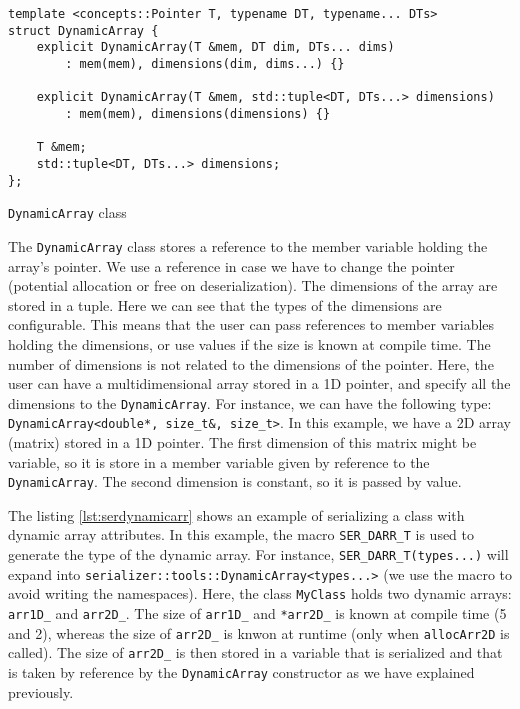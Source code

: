 \begin{listing}[ht!]
\begin{verbatim}
template <concepts::Pointer T, typename DT, typename... DTs>
struct DynamicArray {
    explicit DynamicArray(T &mem, DT dim, DTs... dims)
        : mem(mem), dimensions(dim, dims...) {}

    explicit DynamicArray(T &mem, std::tuple<DT, DTs...> dimensions)
        : mem(mem), dimensions(dimensions) {}

    T &mem;
    std::tuple<DT, DTs...> dimensions;
};
\end{verbatim}
\caption{\texttt{DynamicArray} class}
\label{lst:dynamicarray}
\end{listing}

The \texttt{DynamicArray} class stores a reference to the member variable
holding the array's pointer. We use a reference in case we have to change the
pointer (potential allocation or free on deserialization). The dimensions of the
array are stored in a tuple. Here we can see that the types of the dimensions
are configurable. This means that the user can pass references to member
variables holding the dimensions, or use values if the size is known at compile
time. The number of dimensions is not related to the dimensions of the pointer.
Here, the user can have a multidimensional array stored in a 1D pointer, and
specify all the dimensions to the \texttt{DynamicArray}. For instance, we can
have the following type: \texttt{DynamicArray<double*, size\_t\&, size\_t>}. In
this example, we have a 2D array (matrix) stored in a 1D pointer. The first
dimension of this matrix might be variable, so it is store in a member variable
given by reference to the \texttt{DynamicArray}. The second dimension is
constant, so it is passed by value.

The listing \ref{lst:serdynamicarr} shows an example of serializing a class with
dynamic array attributes. In this example, the macro \texttt{SER\_DARR\_T} is
used to generate the type of the dynamic array. For instance,
\texttt{SER\_DARR\_T(types...)} will expand into
\texttt{serializer::tools::DynamicArray<types...>} (we use the macro to avoid
writing the namespaces). Here, the class \texttt{MyClass} holds two dynamic
arrays: \texttt{arr1D\_} and \texttt{arr2D\_}. The size of \texttt{arr1D\_} and
\texttt{*arr2D\_} is known at compile time (5 and 2), whereas the size of
\texttt{arr2D\_} is knwon at runtime (only when \texttt{allocArr2D} is called).
The size of \texttt{arr2D\_} is then stored in a variable that is serialized and
that is taken by reference by the \texttt{DynamicArray} constructor as we have
explained previously.

